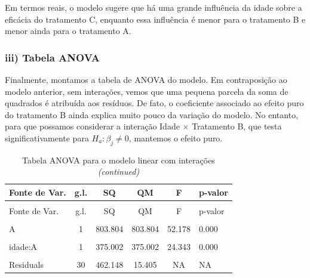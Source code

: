\documentclass[
  letterpaper,
  DIV=11,
  numbers=noendperiod]{scrartcl}
\begin{document}
Em termos reais, o modelo sugere que há uma grande influência da idade
sobre a eficácia do tratamento C, enquanto essa influência é menor para
o tratamento B e menor ainda para o tratamento A.

\hypertarget{iii-tabela-anova}{%
\subsubsection{iii) Tabela ANOVA}\label{iii-tabela-anova}}

Finalmente, montamos a tabela de ANOVA do modelo. Em contraposição ao
modelo anterior, sem interações, vemos que uma pequena parcela da soma
de quadrados é atribuída aos resíduos. De fato, o coeficiente associado
ao efeito puro do tratamento B ainda explica muito pouco da variação do
modelo. No entanto, para que possamos considerar a interação Idade
\(\times\) Tratamento B, que testa significativamente para
\(H_a: \beta_j \neq 0\), mantemos o efeito puro.

\begin{longtable}[t]{lccccl}
\caption{Tabela ANOVA para o modelo linear com interações}\\
\toprule
Fonte de Var. & g.l. & SQ & QM & F & p-valor\\
\midrule
\endfirsthead
\caption[]{Tabela ANOVA para o modelo linear com interações \textit{(continued)}}\\
\toprule
Fonte de Var. & g.l. & SQ & QM & F & p-valor\\
\midrule
\endhead

\endfoot
\bottomrule
\endlastfoot
\cellcolor{gray!15}{idade} & \cellcolor{gray!15}{1} & \cellcolor{gray!15}{3424.432} & \cellcolor{gray!15}{3424.432} & \cellcolor{gray!15}{222.295} & \cellcolor{gray!15}{0.000}\\
A & 1 & 803.804 & 803.804 & 52.178 & 0.000\\
\cellcolor{gray!15}{B} & \cellcolor{gray!15}{1} & \cellcolor{gray!15}{1.189} & \cellcolor{gray!15}{1.189} & \cellcolor{gray!15}{0.077} & \cellcolor{gray!15}{0.783}\\
idade:A & 1 & 375.002 & 375.002 & 24.343 & 0.000\\
\cellcolor{gray!15}{idade:B} & \cellcolor{gray!15}{1} & \cellcolor{gray!15}{328.424} & \cellcolor{gray!15}{328.424} & \cellcolor{gray!15}{21.319} & \cellcolor{gray!15}{0.000}\\
Residuals & 30 & 462.148 & 15.405 & NA & NA\\*
\end{longtable}
\end{document}
